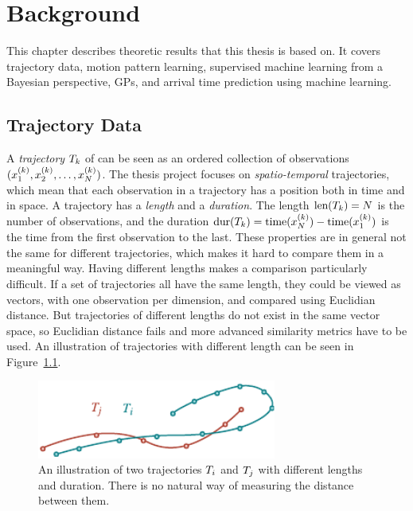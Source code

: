 
\chapter{Background}
This chapter describes theoretic results that this thesis is based
on. It covers trajectory data, motion pattern learning, supervised machine learning from a
Bayesian perspective, GPs, and arrival time prediction using machine learning.

\section{Trajectory Data}\label{sec:trajectory-data}
A \textit{trajectory} $T_{k}$ of can be seen as an ordered collection of
observations $(x^{(k)}_1, x^{(k)}_2, \dots, x^{(k)}_N)$.
The thesis project focuses on \textit{spatio-temporal}
trajectories, which mean that each observation in a trajectory has a position both in time
and in space. A trajectory has a \textit{length} and
a \textit{duration}. The length $\text{len}(T_{k}) = N$ is the number of
observations, and the duration $\text{dur}(T_{k}) = \text{time}(x^{(k)}_N) - \text{time}(x^{(k)}_1)$
is the time from the first observation to the last.
These properties are in general not the same for different
trajectories, which makes it hard to compare them in a
meaningful way. Having different lengths makes a comparison
particularly difficult. If a set of trajectories all have the same length, they could
be viewed as vectors, with one observation per dimension, and compared
using Euclidian distance. But trajectories of different lengths do not
exist in the same vector space, so Euclidian distance fails and more
advanced similarity metrics have to be used.
An illustration of trajectories with different length can be seen in Figure~\ref{fig:trajectory-projection-problems}.
\begin{figure}
  \centering
  \includegraphics[width=0.7\textwidth]{figures/trajectory-projection-problems}
  \caption{An illustration of two trajectories $T_{i}$ and $T_{j}$
    with different lengths and duration. There is no natural way of
    measuring the distance between them.}\label{fig:trajectory-projection-problems}
\end{figure}

